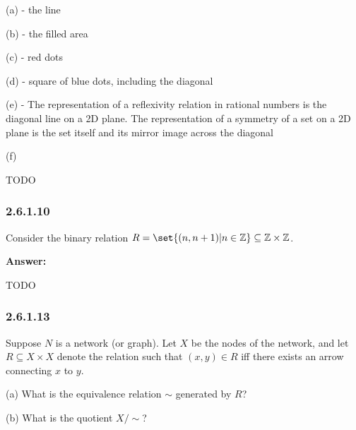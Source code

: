 \documentclass{article}
\newcommand{\Z}{\mathbb{Z}}
\newcommand{\vsp}[0]{\vspace*{10pt}\par}
\newcommand{\exercise}[1]{\subsubsection*{#1}}
\newcommand{\ans}[0]{\vsp\textbf{Answer: }\vsp}
\begin{document}
(a) - the line

(b) - the filled area

(c) - red dots

(d) - square of blue dots, including the diagonal

(e) - The representation of a reflexivity relation in rational numbers is the diagonal line on a 2D
plane. The representation of a symmetry of a set on a 2D plane is the set itself and its mirror
image across the diagonal

(f)

TODO

\exercise{2.6.1.10}

Consider the binary relation $R = \set{(n,n+1)|n\in\Z}\subseteq\Z\times\Z$.

\ans

TODO

\exercise{2.6.1.13}

Suppose $N$ is a network (or graph). Let $X$ be the nodes of the network, and
let $R \subseteq X \times X$ denote the relation such that $(x, y) \in R$ iff
there exists an arrow connecting $x$ to $y$.

\vsp

(a) What is the equivalence relation $\sim$ generated by $R$?

(b) What is the quotient $X/\sim$?

\vsp
\vsp
\vsp

\printbibliography
\end{document}
